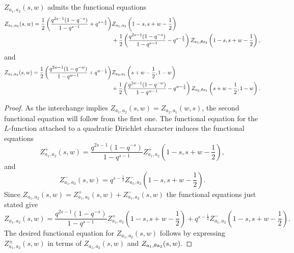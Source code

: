 \documentclass[12pt,reqno,oneside]{amsart}
\begin{document}
    \begin{theorem}\label{thm:double_Dirichlet_series_functional_equation}
        $Z_{a_{1},a_{2}}(s,w)$ admits the functional equations
        \begin{align*}
            Z_{a_{1},a_{2}}(s,w) = \frac{1}{2}\left(\frac{q^{2s-1}(1-q^{-s})}{1-q^{s-1}}+q^{s-\frac{1}{2}}\right)&Z_{a_{1},a_{2}}\left(1-s,s+w-\frac{1}{2}\right) \\
            &+\frac{1}{2}\left(\frac{q^{2s-1}(1-q^{-s})}{1-q^{s-1}}-q^{s-\frac{1}{2}}\right)Z_{a_{1},\theta a_{2}}\left(1-s,s+w-\frac{1}{2}\right),
        \end{align*}
        and
        \begin{align*}
            Z_{a_{1},a_{2}}(s,w) = \frac{1}{2}\left(\frac{q^{2w-1}(1-q^{-w})}{1-q^{w-1}}+q^{w-\frac{1}{2}}\right)&Z_{a_{2},a_{1}}\left(s+w-\frac{1}{2},1-w\right) \\
            &+\frac{1}{2}\left(\frac{q^{2w-1}(1-q^{-w})}{1-q^{w-1}}-q^{w-\frac{1}{2}}\right)Z_{a_{2},\theta a_{1}}\left(s+w-\frac{1}{2},1-w\right).
        \end{align*}
    \end{theorem}
    \begin{proof}
        As the interchange implies $Z_{a_{1},a_{2}}(s,w) = Z_{a_{2},a_{1}}(w,s)$, the second functional equation will follow from the first one. The functional equation for the $L$-function attached to a quadratic Dirichlet character induces the functional equations
        \[
            Z_{a_{1},a_{2}}^{+}(s,w) = \frac{q^{2s-1}(1-q^{-s})}{1-q^{s-1}}Z_{a_{1},a_{2}}^{+}\left(1-s,s+w-\frac{1}{2}\right),
        \]
        and
        \[
            Z_{a_{1},a_{2}}^{-}(s,w) = q^{s-\frac{1}{2}}Z_{a_{1},a_{2}}^{-}\left(1-s,s+w-\frac{1}{2}\right).
        \]
        Since $Z_{a_{1},a_{2}}(s,w) = Z_{a_{1},a_{2}}^{+}(s,w)+Z_{a_{1},a_{2}}^{-}(s,w)$ the functional equations just stated give
        \[
            Z_{a_{1},a_{2}}(s,w) = \frac{q^{2s-1}(1-q^{-s})}{1-q^{s-1}}Z_{a_{1},a_{2}}^{+}\left(1-s,s+w-\frac{1}{2}\right)+q^{s-\frac{1}{2}}Z_{a_{1},a_{2}}^{-}\left(1-s,s+w-\frac{1}{2}\right).
        \]
        The desired functional equation for $Z_{a_{1},a_{2}}(s,w)$ follows by expressing $Z_{a_{1},a_{2}}^{\pm}(s,w)$ in terms of $Z_{a_{1},a_{2}}(s,w)$ and $Z_{a_{1},\theta a_{2}}(s,w)$.
    \end{proof}
\end{document}
